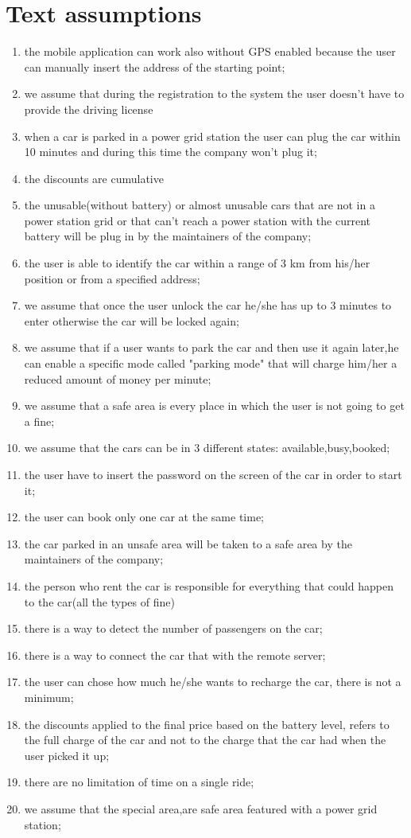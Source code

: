 \section{Text assumptions}
\begin{enumerate}
	\item the mobile application can work also without GPS enabled because the user can manually insert the address of the starting point;
	\item we assume that during the registration to the system the user doesn't have to provide the driving license
	\item when a car is parked in a power grid station the user can plug the car within 10 minutes and during this time the company won't plug it;
	\item the discounts are cumulative
	\item the unusable(without battery) or almost unusable cars that are not in a power station grid or that can't reach a power station with the current battery will be plug in by the maintainers of the company;
	\item the user is able to identify the car within a range of 3 km from his/her position or from a specified address;
	\item we assume that once the user unlock the car he/she has up to 3 minutes to enter otherwise the car will be locked again;
	\item we assume that if a user wants to park the car and then use it again later,he can enable a specific mode called "parking mode" that will charge him/her a reduced amount of money per minute;
	\item we assume that a safe area is every  place in which the user is not going to get a fine;
	\item we assume that the cars can be in 3 different states: available,busy,booked;
	\item the user have to insert the password on the screen of the car in order to start it;
	\item the user can book only one car at the same time;
	\item the car parked in an unsafe area will be taken to a safe area by the maintainers of the company;
	\item the person who rent the car is responsible for everything that could happen to the car(all the types of fine)
	\item there is a way to detect the number of passengers on the car;
	\item there is a way to connect the car  that with the remote server;
	\item the user can chose how much he/she wants to recharge the car, there is not a minimum;
	\item the discounts applied to the final price based on the battery level, refers to the full charge of the car and not to the charge that the car had when the user picked it up;
	\item there are no limitation of time on a single ride;
	\item we assume that the special area,are safe area featured with a power grid station;
\end{enumerate}